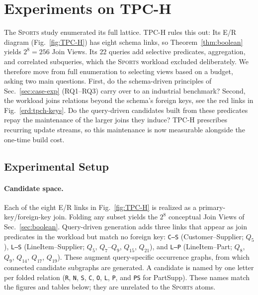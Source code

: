 \documentclass[sigconf]{acmart}
\begin{document}
\section{Experiments on TPC-H}\label{sec:tpch-exp}


The \textsc{Sports} study enumerated its full lattice. TPC-H rules this out: Its E/R diagram (Fig.~\ref{fig:TPC-H}) has eight schema links, so Theorem~\ref{thm:boolean} yields $2^8=256$ Join Views. Its $22$ queries add selective predicates, aggregation, and correlated subqueries, which the \textsc{Sports} workload excluded deliberately. We therefore move from full enumeration to selecting views based on a budget, asking two main questions. First, do the schema-driven principles of Sec.~\ref{sec:case-exp} (RQ1--RQ3) carry over to an industrial benchmark? Second, the workload joins relations beyond the schema's foreign keys, see the red links in Fig.~\ref{erd:tpch-keys}. Do the query-driven candidates built from these predicates repay the maintenance of the larger joins they induce? TPC-H prescribes recurring update streams, so this maintenance is now measurable alongside the one-time build cost.

\subsection{Experimental Setup}\label{sec:tpch:setup}

\paragraph{Candidate space.}
Each of the eight E/R links in Fig.~\ref{fig:TPC-H} is realized as a primary-key/foreign-key join. Folding any subset yields the $2^8$ conceptual Join Views of Sec.~\ref{sec:boolean}. Query-driven generation adds three links that appear as join predicates in the workload but match no foreign key: \texttt{C--S} (\textsf{Customer}--\textsf{Supplier}; $Q_5$), \texttt{L--S} (\textsf{LineItem}--\textsf{Supplier}; $Q_5$, $Q_7$--$Q_9$, $Q_{15}$, $Q_{21}$), and \texttt{L--P} (\textsf{LineItem}--\textsf{Part}; $Q_8$, $Q_9$, $Q_{14}$, $Q_{17}$, $Q_{19}$). These augment query-specific occurrence graphs, from which connected candidate subgraphs are generated. A candidate is named by one letter per folded relation (\texttt{R}, \texttt{N}, \texttt{S}, \texttt{C}, \texttt{O}, \texttt{L}, \texttt{P}, and \texttt{PS} for \textsf{PartSupp}). These names match the figures and tables below; they are unrelated to the \textsc{Sports} atoms.
\end{document}
